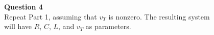 \documentclass[preview]{standalone}
\begin{document}
\begin{center}
\raggedright
                    \textbf{Question 4}\\
                    Repeat Part 1, assuming that $v_T$ is nonzero. The resulting system\\ 
                    will have $R$, $C$, $L$, and $v_T$ as parameters.
\end{center}
\end{document}
